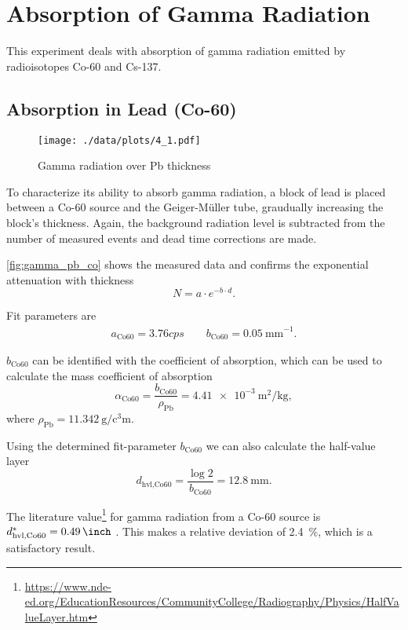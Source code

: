 \chapter{Absorption of Gamma Radiation}
This experiment deals with absorption of gamma radiation emitted by radioisotopes Co-60 and Cs-137.

\section{Absorption in Lead (Co-60)}\label{sec:co}
\begin{figure}[ht!]
	\centering
	\texttt{[image: ./data/plots/4\_1.pdf]}
	\caption[Gamma radiation over Pb thickness (Co-60)]{Gamma radiation over Pb thickness}
	\label{fig:gamma_pb_co}
\end{figure}
To characterize its ability to absorb gamma radiation, a block of lead is placed between a Co-60 source and the Geiger-Müller tube, graudually increasing the block's thickness.
Again, the background radiation level is subtracted from the number of measured events and dead time corrections are made.

\autoref{fig:gamma_pb_co} shows the measured data and confirms the exponential attenuation with thickness
\begin{equation*}
	N = a \cdot e^{-b \cdot d}.
\end{equation*}

Fit parameters are
\begin{gather*}
	a_\text{Co60}=\num{3.76}cps\qquad b_\text{Co60}=\SI{0.05}{\milli\meter}^{-1}.
\end{gather*}

$b_\text{Co60}$ can be identified with the coefficient of absorption, which can be used to calculate the mass coefficient of absorption
\begin{equation*}
	\alpha_\text{Co60}=\frac{b_\text{Co60}}{\rho_\text{Pb}}=\SI{4.41e-3}{\meter\squared\per\kilogram},
\end{equation*}
where $\rho_\text{Pb}=\SI{11.342}{\gram\per\cubic\centi\meter}$.

Using the determined fit-parameter $b_\text{Co60}$ we can also calculate the half-value layer
\begin{equation*}
	d_\text{hvl,Co60}=\frac{\log{2}}{b_\text{Co60}}=\SI{12.8}{\milli\meter}.
\end{equation*}

The literature value\footnote{\url{https://www.nde-ed.org/EducationResources/CommunityCollege/Radiography/Physics/HalfValueLayer.htm}} for gamma radiation from a Co-60 source is $d_\text{hvl,Co60}^{*}=\SI{0.49}{\inch}$ .
This makes a relative deviation of \SI{2.4}{\percent}, which is a satisfactory result.

